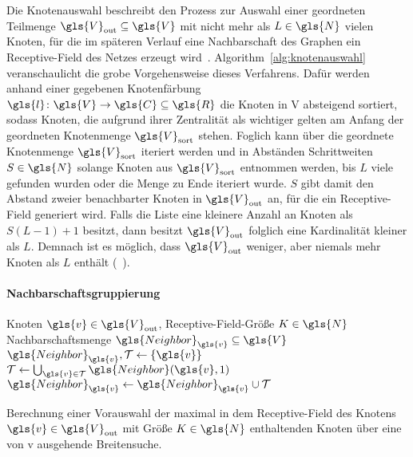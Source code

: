 Die Knotenauswahl beschreibt den Prozess zur Auswahl einer geordneten Teilmenge $\gls{V}_{\mathrm{out}} \subseteq \gls{V}$ mit nicht mehr als $L \in \gls{N}$ vielen Knoten, für die im späteren Verlauf eine Nachbarschaft des Graphen \bzw{} ein Receptive-Field des Netzes erzeugt wird~\cite{patchy}.
Algorithm~\ref{alg:knotenauswahl} veranschaulicht die grobe Vorgehensweise dieses Verfahrens.
Dafür werden anhand einer gegebenen Knotenfärbung $\gls{l} \colon \gls{V} \to \gls{C} \subseteq \gls{R}$ die Knoten in \gls{V} absteigend sortiert, sodass Knoten, die aufgrund ihrer Zentralität als wichtiger gelten am Anfang der geordneten Knotenmenge $\gls{V}_{\mathrm{sort}}$ stehen.
Foglich kann über die geordnete Knotenmenge $\gls{V}_{\mathrm{sort}}$ iteriert werden und in Abständen \bzw{} Schrittweiten $S \in \gls{N}$ solange Knoten aus $\gls{V}_{\mathrm{sort}}$ entnommen werden, bis $L$ viele gefunden wurden oder die Menge zu Ende iteriert wurde.
$S$ gibt damit den Abstand zweier benachbarter Knoten in $\gls{V}_{\mathrm{out}}$ an, für die ein Receptive-Field generiert wird.
Falls die Liste eine kleinere Anzahl an Knoten als $S\left( L -1 \right) + 1$ besitzt, dann besitzt $\gls{V}_{\mathrm{out}}$ folglich eine Kardinalität kleiner als $L$.
Demnach ist es möglich, dass $\gls{V}_{\mathrm{out}}$ weniger, aber niemals mehr Knoten als $L$ enthält (\vgl{}~\cite{patchy}).

\paragraph{Nachbarschaftsgruppierung}
\label{nachbarschaftsgruppierung}

\begin{algorithm}[t]
\centering
\begin{algorithmic}
  \REQUIRE{} Knoten $\gls{v} \in \gls{V}_{\mathrm{out}}$, Receptive-Field-Größe $K \in \gls{N}$
  \ENSURE{} Nachbarschaftsmenge $\gls{Neighbor}_{\gls{v}} \subseteq \gls{V}$
  \STATE{} $\gls{Neighbor}_{\gls{v}}, \mathcal{T} \leftarrow \left\{\gls{v}\right\}$
    \STATE{} $\mathcal{T} \leftarrow \bigcup_{\gls{v} \in \mathcal{T}} \gls{Neighbor}\left(\gls{v}, 1\right)$
    \STATE{} $\gls{Neighbor}_{\gls{v}} \leftarrow \gls{Neighbor}_{\gls{v}} \cup \mathcal{T}$
  \ENDWHILE{}
\end{algorithmic}
\caption[Nachbarschaftsgruppierung]{Berechnung einer Vorauswahl der maximal in dem Receptive-Field des Knotens $\gls{v} \in \gls{V}_{\mathrm{out}}$ mit Größe $K \in \gls{N}$ enthaltenden Knoten über eine von \gls{v} ausgehende Breitensuche.}
\label{alg:nachbarschaftsgruppierung}
\end{algorithm}

